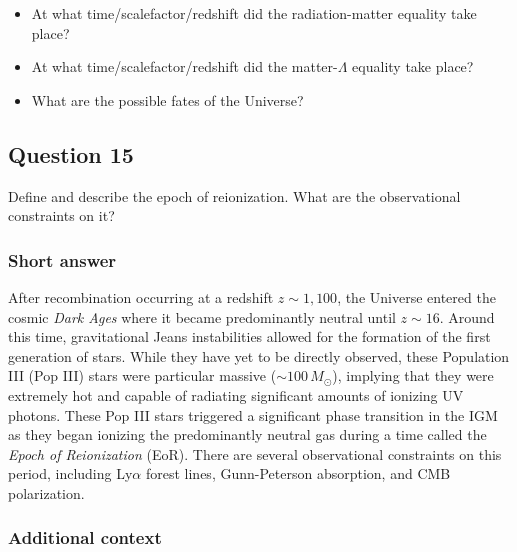 \documentclass[a4paper,11pt]{article}
\begin{document}
\begin{itemize}
    \item At what time/scalefactor/redshift did the radiation-matter equality take place?
    \item At what time/scalefactor/redshift did the matter-$\Lambda$ equality take place?
    \item What are the possible fates of the Universe?
\end{itemize}

%
%

\newpage
\subsection{Question 15}

Define and describe the epoch of reionization. What are the observational constraints on it?

\subsubsection{Short answer}

After recombination occurring at a redshift $z\sim1,100$, the Universe entered the cosmic \textit{Dark Ages} where it became predominantly neutral until $z\sim16$. Around this time, gravitational Jeans instabilities allowed for the formation of the first generation of stars. While they have yet to be directly observed, these Population III (Pop III) stars were particular massive ($\sim100\,M_\odot$), implying that they were extremely hot and capable of radiating significant amounts of ionizing UV photons. These Pop III stars triggered a significant phase transition in the IGM as they began ionizing the predominantly neutral gas during a time called the \textit{Epoch of Reionization} (EoR). There are several observational constraints on this period, including Ly$\alpha$ forest lines, Gunn-Peterson absorption, and CMB polarization.


\subsubsection{Additional context}
\end{document}
